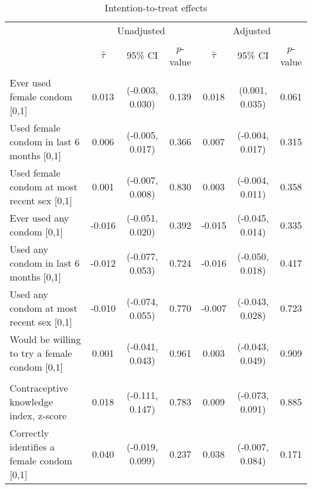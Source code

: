 \begin{table}

\caption{\label{tab:}Intention-to-treat effects}
\centering
\fontsize{9}{11}\selectfont
\begin{tabular}[t]{lcccccc}
\toprule
\multicolumn{1}{c}{ } & \multicolumn{3}{c}{Unadjusted} & \multicolumn{3}{c}{Adjusted} \\
\cmidrule(l{3pt}r{3pt}){2-4} \cmidrule(l{3pt}r{3pt}){5-7}
 & $\widehat{\tau}$ & 95\% CI & $p$-value & $\widehat{\tau}$ & 95\% CI & $p$-value\\
\midrule
\rowcolor{gray!6}  \addlinespace[0.3em]
\multicolumn{7}{l}{\textit{Primary outcomes}}\\
\hspace{1em}Ever used female condom [0,1] & 0.013 & (-0.003, 0.030) & 0.139 & 0.018 & (0.001, 0.035) & 0.061\\
\hspace{1em}Used female condom in last 6 months [0,1] & 0.006 & (-0.005, 0.017) & 0.366 & 0.007 & (-0.004, 0.017) & 0.315\\
\rowcolor{gray!6}  \hspace{1em}Used female condom at most recent sex [0,1] & 0.001 & (-0.007, 0.008) & 0.830 & 0.003 & (-0.004, 0.011) & 0.358\\
\hspace{1em}Ever used any condom [0,1] & -0.016 & (-0.051, 0.020) & 0.392 & -0.015 & (-0.045, 0.014) & 0.335\\
\rowcolor{gray!6}  \hspace{1em}Used any condom in last 6 months [0,1] & -0.012 & (-0.077, 0.053) & 0.724 & -0.016 & (-0.050, 0.018) & 0.417\\
\hspace{1em}Used any condom at most recent sex [0,1] & -0.010 & (-0.074, 0.055) & 0.770 & -0.007 & (-0.043, 0.028) & 0.723\\
\rowcolor{gray!6}  \hspace{1em}Would be willing to try a female condom [0,1] & 0.001 & (-0.041, 0.043) & 0.961 & 0.003 & (-0.043, 0.049) & 0.909\\
\addlinespace[0.3em]
\multicolumn{7}{l}{\textit{Secondary outcomes}}\\
\hspace{1em}Contraceptive knowledge index, z-score & 0.018 & (-0.111, 0.147) & 0.783 & 0.009 & (-0.073, 0.091) & 0.885\\
\rowcolor{gray!6}  \hspace{1em}Correctly identifies a female condom [0,1] & 0.040 & (-0.019, 0.099) & 0.237 & 0.038 & (-0.007, 0.084) & 0.171\\

\end{tabular}
\end{table}
